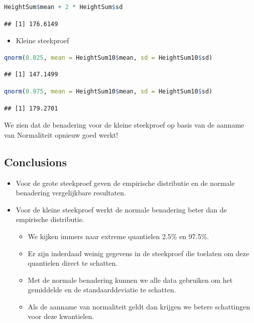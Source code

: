 \documentclass[
  12pt,dutch,coursenotes]{book}
\providecommand{\tightlist}{%
  \setlength{\itemsep}{0pt}\setlength{\parskip}{0pt}}
\begin{document}
\begin{lstlisting}[language=R]
HeightSum$mean + 2 * HeightSum$sd
\end{lstlisting}

\begin{lstlisting}
## [1] 176.6149
\end{lstlisting}

\begin{itemize}
\tightlist
\item
  Kleine steekproef
\end{itemize}

\begin{lstlisting}[language=R]
qnorm(0.025, mean = HeightSum10$mean, sd = HeightSum10$sd)
\end{lstlisting}

\begin{lstlisting}
## [1] 147.1499
\end{lstlisting}

\begin{lstlisting}[language=R]
qnorm(0.975, mean = HeightSum10$mean, sd = HeightSum10$sd)
\end{lstlisting}

\begin{lstlisting}
## [1] 179.2701
\end{lstlisting}

We zien dat de benadering voor de kleine steekproef op basis van de aanname van Normaliteit opnieuw goed werkt!

\hypertarget{conclusions}{%
\subsection{Conclusions}\label{conclusions}}

\begin{itemize}
\item
  Voor de grote steekproef geven de empirische distributie en de normale benadering vergelijkbare resultaten.
\item
  Voor de kleine steekproef werkt de normale benadering beter dan de empirische distributie.

  \begin{itemize}
  \tightlist
  \item
    We kijken immers naar extreme quantielen 2.5\% en 97.5\%.
  \item
    Er zijn inderdaad weinig gegevens in de steekproef die toelaten om deze quantielen direct te schatten.
  \item
    Met de normale benadering kunnen we alle data gebruiken om het gemiddelde en de standaarddeviatie te schatten.
  \item
    Als de aanname van normaliteit geldt dan krijgen we betere schattingen voor deze kwantielen.
  \end{itemize}
\end{itemize}
\end{document}
